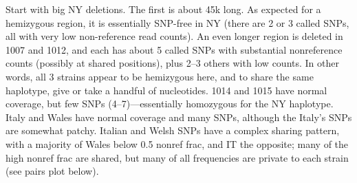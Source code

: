 \documentclass{article}\usepackage[]{graphicx}\usepackage[]{color}
\begin{document}
Start with big NY deletions.  The first is about 45k long.  As expected for a hemizygous region, it is essentially SNP-free in NY (there are 2 or 3 called SNPs, all with very low non-reference read counts).
An even longer region is deleted in 1007 and 1012, and each has about 5 called SNPs with substantial nonreference counts (possibly at shared positions), plus 2--3 others with low counts.  In other words, all 3 strains appear to be hemizygous here, and to share the same haplotype, give or take a handful of nucleotides.  1014 and 1015 have normal coverage, but few SNPs (4--7)---essentially homozygous for the NY haplotype.  Italy and Wales have normal coverage and many SNPs, although the Italy's SNPs are somewhat patchy.  Italian and Welsh SNPs have a complex sharing pattern, with a majority of Wales below 0.5 nonref frac, and IT the opposite; many of the high nonref frac are shared, but many of all frequencies are private to each strain (see pairs plot below).
\end{document}
